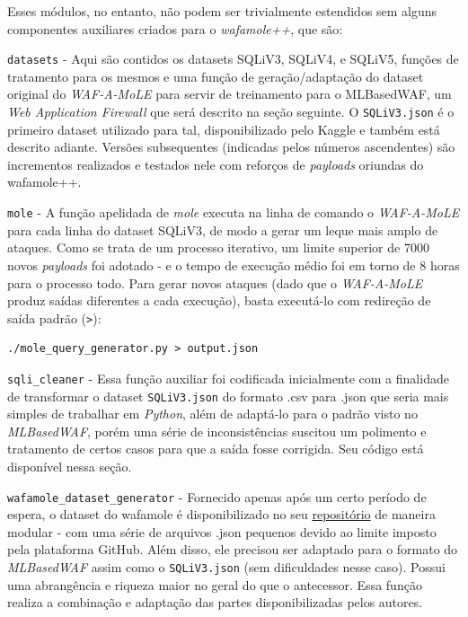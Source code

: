 Esses módulos, no entanto, não podem ser trivialmente estendidos sem alguns componentes auxiliares criados para o \textit{wafamole++}, que são:
\begin{alineas}
\item \verb+datasets+ - Aqui são contidos os datasets SQLiV3, SQLiV4, e SQLiV5, funções de tratamento para os mesmos e uma função de geração/adaptação do dataset original do \textit{WAF-A-MoLE} para servir de treinamento para o MLBasedWAF, um \textit{Web Application Firewall} que será descrito na seção seguinte. O \verb+SQLiV3.json+ é o primeiro dataset utilizado para tal, disponibilizado pelo Kaggle e também está descrito adiante. Versões subsequentes (indicadas pelos números ascendentes) são incrementos realizados e testados nele com reforços de \textit{payloads} oriundas do wafamole++.

\begin{alineas}
\item \verb+mole+ - A função apelidada de \textit{mole} executa na linha de comando o \textit{WAF-A-MoLE} para cada linha do dataset SQLiV3, de modo a gerar um leque mais amplo de ataques. Como se trata de um processo iterativo, um limite superior de 7000 novos \textit{payloads} foi adotado - e o tempo de execução médio foi em torno de 8 horas para o processo todo. Para gerar novos ataques (dado que o \textit{WAF-A-MoLE} produz saídas diferentes a cada execução), basta executá-lo com redireção de saída padrão (\verb+>+):
\begin{verbatim}
./mole_query_generator.py > output.json
\end{verbatim}

\item \verb+sqli_cleaner+ - Essa função auxiliar foi codificada inicialmente com a finalidade de transformar o dataset \verb+SQLiV3.json+ do formato .csv para .json que seria mais simples de trabalhar em \textit{Python}, além de adaptá-lo para o padrão visto no \textit{MLBasedWAF}, porém uma série de inconsistências suscitou um polimento e tratamento de certos casos para que a saída fosse corrigida. Seu código está disponível nessa seção.

\item \verb+wafamole_dataset_generator+ - Fornecido apenas após um certo período de espera, o dataset do wafamole é disponibilizado no seu \href{https://github.com/zangobot/wafamole_dataset}{repositório} de maneira modular - com uma série de arquivos .json pequenos devido ao limite imposto pela plataforma GitHub. Além disso, ele precisou ser adaptado para o formato do \textit{MLBasedWAF} assim como o \verb+SQLiV3.json+ (sem dificuldades nesse caso). Possui uma abrangência e riqueza maior no geral do que o antecessor. Essa função realiza a combinação e adaptação das partes disponibilizadas pelos autores.


\end{alineas}
\end{alineas}
